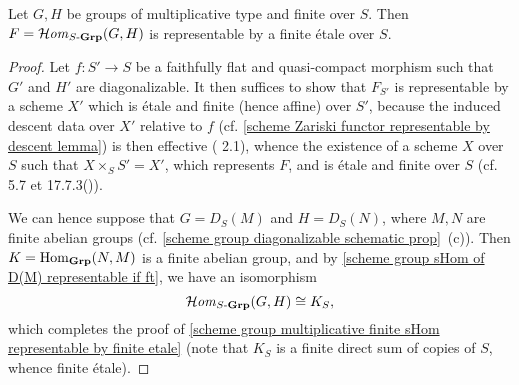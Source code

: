 \begin{lemma}\label{scheme group multiplicative finite sHom representable by finite etale}
Let $G,H$ be groups of multiplicative type and finite over $S$. Then $F=\operatorname{\mathcal{H}\hspace*{-0.4pt}\textit{om}\hspace{0.5pt}}_{S\textup{-}\mathbf{Grp}}(G,H)$ is representable by a finite \'etale over $S$.
\end{lemma}
\begin{proof}
Let $f:S'\to S$ be a faithfully flat and quasi-compact morphism such that $G'$ and $H'$ are diagonalizable. It then suffices to show that $F_{S'}$ is representable by a scheme $X'$ which is \'etale and finite (hence affine) over $S'$, because the induced descent data over $X'$ relative to $f$ (cf. \cref{scheme Zariski functor representable by descent lemma}) is then effective (\cite{SGA1}  2.1), whence the existence of a scheme $X$ over $S$ such that $X\times_SS'=X'$, which represents $F$, and is \'etale and finite over $S$ (cf. \cite{SGA1}  5.7 et \cite{EGA4-4} 17.7.3()).\par
We can hence suppose that $G=D_S(M)$ and $H=D_S(N)$, where $M,N$ are finite abelian groups (cf. \cref{scheme group diagonalizable schematic prop}~(c)). Then $K=\mathrm{Hom}_{\mathbf{Grp}}(N,M)$ is a finite abelian group, and by \cref{scheme group sHom of D(M) representable if ft}, we have an isomorphism
\[\operatorname{\mathcal{H}\hspace*{-0.4pt}\textit{om}\hspace{0.5pt}}_{S\textup{-}\mathbf{Grp}}(G,H)\cong K_S,\]
which completes the proof of \cref{scheme group multiplicative finite sHom representable by finite etale} (note that $K_S$ is a finite direct sum of copies of $S$, whence finite \'etale).
\end{proof}

